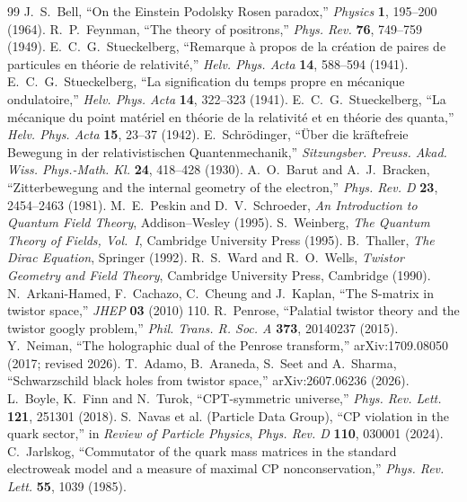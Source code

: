 \documentclass[11pt]{article}
\theoremstyle{definition}\newtheorem{definition}[theorem]{Definition}
\theoremstyle{remark}\newtheorem{remark}[theorem]{Remark}\newtheorem{conjecture}[theorem]{Conjecture}
\begin{document}
\begin{thebibliography}{99}
 J.~S.~Bell, ``On the Einstein Podolsky Rosen paradox,'' \emph{Physics} \textbf{1}, 195--200 (1964).
 R.~P.~Feynman, ``The theory of positrons,'' \emph{Phys. Rev.} \textbf{76}, 749--759 (1949).
 E.~C.~G.~Stueckelberg, ``Remarque \`a propos de la cr\'eation de paires de particules en th\'eorie de relativit\'e,'' \emph{Helv. Phys. Acta} \textbf{14}, 588--594 (1941).
 E.~C.~G.~Stueckelberg, ``La signification du temps propre en m\'ecanique ondulatoire,'' \emph{Helv. Phys. Acta} \textbf{14}, 322--323 (1941).
 E.~C.~G.~Stueckelberg, ``La m\'ecanique du point mat\'eriel en th\'eorie de la relativit\'e et en th\'eorie des quanta,'' \emph{Helv. Phys. Acta} \textbf{15}, 23--37 (1942).
 E.~Schr\"odinger, ``\"Uber die kr\"aftefreie Bewegung in der relativistischen Quantenmechanik,'' \emph{Sitzungsber. Preuss. Akad. Wiss. Phys.-Math. Kl.} \textbf{24}, 418--428 (1930).
 A.~O.~Barut and A.~J.~Bracken, ``Zitterbewegung and the internal geometry of the electron,'' \emph{Phys. Rev. D} \textbf{23}, 2454--2463 (1981).
 M.~E.~Peskin and D.~V.~Schroeder, \emph{An Introduction to Quantum Field Theory}, Addison--Wesley (1995).
 S.~Weinberg, \emph{The Quantum Theory of Fields, Vol.~I}, Cambridge University Press (1995).
 B.~Thaller, \emph{The Dirac Equation}, Springer (1992).
 R.~S.~Ward and R.~O.~Wells, \emph{Twistor Geometry and Field Theory}, Cambridge University Press, Cambridge (1990).
 N.~Arkani-Hamed, F.~Cachazo, C.~Cheung and J.~Kaplan, ``The S-matrix in twistor space,'' \emph{JHEP} \textbf{03} (2010) 110.
 R.~Penrose, ``Palatial twistor theory and the twistor googly problem,'' \emph{Phil. Trans. R. Soc. A} \textbf{373}, 20140237 (2015).
 Y.~Neiman, ``The holographic dual of the Penrose transform,'' arXiv:1709.08050 (2017; revised 2026).
 T.~Adamo, B.~Araneda, S.~Seet and A.~Sharma, ``Schwarzschild black holes from twistor space,'' arXiv:2607.06236 (2026).
 L.~Boyle, K.~Finn and N.~Turok, ``CPT-symmetric universe,'' \emph{Phys. Rev. Lett.} \textbf{121}, 251301 (2018).
 S.~Navas et al. (Particle Data Group), ``CP violation in the quark sector,'' in \emph{Review of Particle Physics}, \emph{Phys. Rev. D} \textbf{110}, 030001 (2024).
 C.~Jarlskog, ``Commutator of the quark mass matrices in the standard electroweak model and a measure of maximal CP nonconservation,'' \emph{Phys. Rev. Lett.} \textbf{55}, 1039 (1985).

\end{thebibliography}
\end{document}
